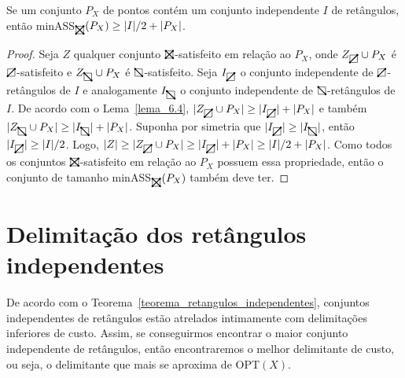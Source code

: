 \begin{theorem}\label{teorema_retangulos_independentes}
    Se um conjunto $P_X$ de pontos contém um conjunto independente $I$ de retângulos, então minASS$_{\recttotal}(P_X) \geq |I|/2 + |P_X|$.
\end{theorem}

\begin{proof}
    Seja $Z$ qualquer conjunto $\recttotal$-satisfeito em relação ao $P_X$, onde $Z_{\rectpos} \cup P_X$ é $\rectpos$-satisfeito e  $Z_{\rectneg} \cup P_X$ é $\rectneg$-satisfeito. Seja $I_{\rectpos}$ o conjunto independente de $\rectpos$-retângulos de $I$ e analogamente $I_{\rectneg}$ o conjunto independente de $\rectneg$-retângulos de $I$. De acordo com o Lema~\ref{lema_6.4}, $|Z_{\rectpos} \cup P_X| \geq |I_{\rectpos}| + |P_X|$ e também $|Z_{\rectneg} \cup P_X| \geq |I_{\rectneg}| + |P_X|$. Suponha por simetria que $|I_{\rectpos}| \geq |I_{\rectneg}|$, então $|I_{\rectpos}| \geq |I|/2$. Logo, $|Z| \geq |Z_{\rectpos} \cup P_X| \geq |I_{\rectpos}| + |P_X| \geq |I|/2 + |P_X|$. Como todos os conjuntos $\recttotal$-satisfeito em relação ao $P_X$ possuem essa propriedade, então o conjunto de tamanho minASS$_{\recttotal}(P_X)$ também deve ter.
\end{proof}

\section{Delimitação dos retângulos independentes}

De acordo com o Teorema~\ref{teorema_retangulos_independentes}, conjuntos independentes de retângulos estão atrelados intimamente com delimitações inferiores de custo. Assim, se conseguirmos encontrar o maior conjunto independente de retângulos, então encontraremos o melhor delimitante de custo, ou seja, o delimitante que mais se aproxima de OPT$(X)$.

